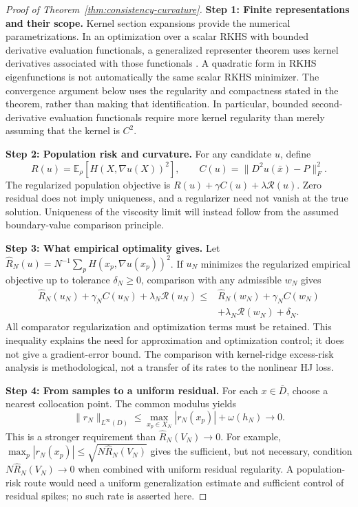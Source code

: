 \documentclass[11pt]{article}
\theoremstyle{plain}      %
\theoremstyle{definition} %
\begin{document}
\begin{proof}[Proof of Theorem~\ref{thm:consistency-curvature}]
\textbf{Step 1: Finite representations and their scope.}
Kernel section expansions provide the numerical parametrizations. In an optimization over a scalar RKHS with bounded derivative evaluation functionals, a generalized representer theorem uses kernel derivatives associated with those functionals \cite{Chen2021}. A quadratic form in RKHS eigenfunctions is not automatically the same scalar RKHS minimizer. The convergence argument below uses the regularity and compactness stated in the theorem, rather than making that identification. In particular, bounded second-derivative evaluation functionals require more kernel regularity than merely assuming that the kernel is $C^2$.

\medskip\noindent\textbf{Step 2: Population risk and curvature.}
For any candidate $u$, define
\[
 R(u)=\mathbb E_\rho[H(X,\nabla u(X))^2],\qquad
 C(u)=\|D^2u(\bar x)-P\|_F^2.
\]
The regularized population objective is $R(u)+\gamma C(u)+\lambda\mathcal R(u)$. Zero residual does not imply uniqueness, and a regularizer need not vanish at the true solution. Uniqueness of the viscosity limit will instead follow from the assumed boundary-value comparison principle.

\medskip\noindent\textbf{Step 3: What empirical optimality gives.}
Let $\widehat R_N(u)=N^{-1}\sum_p H(x_p,\nabla u(x_p))^2$. If $u_N$ minimizes the regularized empirical objective up to tolerance $\delta_N\geq0$, comparison with any admissible $w_N$ gives
\begin{equation}\label{eq:excess-risk}
\begin{aligned}
\widehat R_N(u_N)+\gamma_N C(u_N)+\lambda_N\mathcal R(u_N)
\leq{}&\widehat R_N(w_N)+\gamma_N C(w_N)\\
&+\lambda_N\mathcal R(w_N)+\delta_N.
\end{aligned}
\end{equation}
All comparator regularization and optimization terms must be retained. This inequality explains the need for approximation and optimization control; it does not give a gradient-error bound. The comparison with kernel-ridge excess-risk analysis \cite{CaponnettoDeVito2007,SteinwartChristmann2008} is methodological, not a transfer of its rates to the nonlinear HJ loss.

\medskip\noindent\textbf{Step 4: From samples to a uniform residual.}
For each $x\in\overline D$, choose a nearest collocation point. The common modulus yields
\begin{equation}\label{eq:uniform-residual}
 \|r_N\|_{L^\infty(D)}
 \leq \max_{x_p\in X_N}|r_N(x_p)|+\omega(h_N)\longrightarrow0.
\end{equation}
This is a stronger requirement than $\widehat R_N(V_N)\to0$. For example,
$\max_p|r_N(x_p)|\leq\sqrt{N\widehat R_N(V_N)}$ gives the sufficient, but not necessary, condition $N\widehat R_N(V_N)\to0$ when combined with uniform residual regularity. A population-risk route would need a uniform generalization estimate and sufficient control of residual spikes; no such rate is asserted here.


\end{proof}
\end{document}
